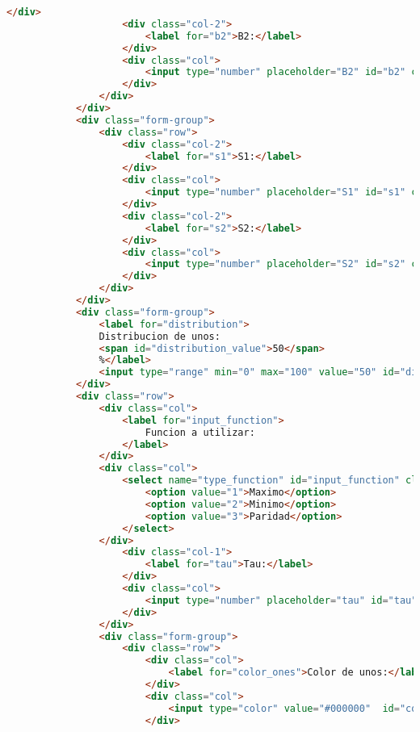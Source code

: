 \documentclass[a4paper,12pt]{article}
\begin{document}
\begin{lstlisting}[language=html]
                    </div>
                    <div class="col-2">
                        <label for="b2">B2:</label>
                    </div>
                    <div class="col">
                        <input type="number" placeholder="B2" id="b2" class="form-control" value="3"/>
                    </div>
                </div>
            </div>
            <div class="form-group">
                <div class="row">
                    <div class="col-2">
                        <label for="s1">S1:</label>
                    </div>
                    <div class="col">
                        <input type="number" placeholder="S1" id="s1" class="form-control" value="3" />
                    </div>
                    <div class="col-2">
                        <label for="s2">S2:</label>
                    </div>
                    <div class="col">
                        <input type="number" placeholder="S2" id="s2" class="form-control" value="3"/>
                    </div>
                </div>
            </div>
            <div class="form-group">
                <label for="distribution">
                Distribucion de unos:
                <span id="distribution_value">50</span>
                %</label>
                <input type="range" min="0" max="100" value="50" id="distribution">
            </div>
            <div class="row">
                <div class="col">
                    <label for="input_function">
                        Funcion a utilizar:
                    </label>
                </div>
                <div class="col">
                    <select name="type_function" id="input_function" class="form-control">
                        <option value="1">Maximo</option>
                        <option value="2">Minimo</option>
                        <option value="3">Paridad</option>
                    </select>
                </div>
                    <div class="col-1">
                        <label for="tau">Tau:</label>
                    </div>
                    <div class="col">
                        <input type="number" placeholder="tau" id="tau" class="form-control" value="3"/>
                    </div>
                </div>
                <div class="form-group">
                    <div class="row">
                        <div class="col">
                            <label for="color_ones">Color de unos:</label>
                        </div>
                        <div class="col">
                            <input type="color" value="#000000"  id="color_ones">
                        </div>

\end{lstlisting}
\end{document}
